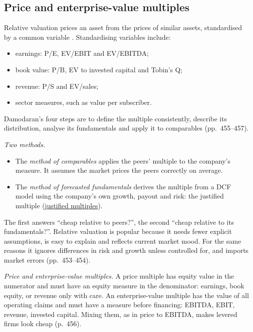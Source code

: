 \subsection{Price and enterprise-value multiples}

\begin{qfmethod}\label{meth:multiples-valuation-basics}
 Relative valuation prices an asset from the prices of similar assets, standardised by a common variable \citep[pp.~453--455]{investment-valuation-2012}. Standardising variables include:
\begin{itemize}
\item earnings: P/E, EV/EBIT and EV/EBITDA;
\item book value: P/B, EV to invested capital and Tobin's Q;
\item revenue: P/S and EV/sales;
\item sector measures, such as value per subscriber.
\end{itemize}
Damodaran's four steps are to define the multiple consistently, describe its distribution, analyse its fundamentals and apply it to comparables (pp.~455--457).

\emph{Two methods.}
\begin{itemize}
\item The \emph{method of comparables} applies the peers' multiple to the company's measure. It assumes the market prices the peers correctly on average.
\item The \emph{method of forecasted fundamentals} derives the multiple from a DCF model using the company's own growth, payout and risk: the justified multiple (\hyperref[meth:justified-multiples]{justified multiples}).
\end{itemize}
The first answers ``cheap relative to peers?'', the second ``cheap relative to its fundamentals?''. Relative valuation is popular because it needs fewer explicit assumptions, is easy to explain and reflects current market mood. For the same reasons it ignores differences in risk and growth unless controlled for, and imports market errors (pp.~453--454).

\emph{Price and enterprise-value multiples.} A price multiple has equity value in the numerator and must have an equity measure in the denominator: earnings, book equity, or revenue only with care. An enterprise-value multiple has the value of all operating claims and must have a measure before financing: EBITDA, EBIT, revenue, invested capital. Mixing them, as in price to EBITDA, makes levered firms look cheap (p.~456).


\end{qfmethod}
